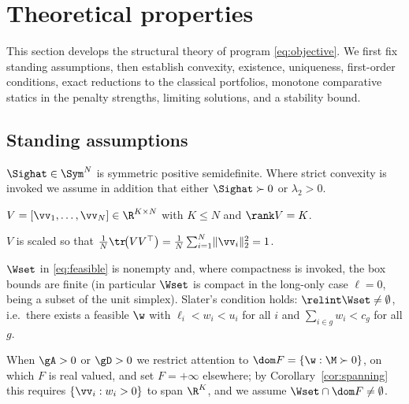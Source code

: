 \section{Theoretical properties}
\label{sec:theory}

This section develops the structural theory of program \eqref{eq:objective}. We
first fix standing assumptions, then establish convexity, existence, uniqueness,
first-order conditions, exact reductions to the classical portfolios, monotone
comparative statics in the penalty strengths, limiting solutions, and a stability
bound.

\subsection{Standing assumptions}
\label{sec:assumptions}

\begin{assumption}
\label{as:sigma}
$\Sighat\in\Sym^{N}$ is symmetric positive semidefinite. Where strict convexity
is invoked we assume in addition that either $\Sighat\succ0$ or $\lambda_2>0$.
\end{assumption}

\begin{assumption}
\label{as:V}
$V=[\vv_1,\dots,\vv_N]\in\R^{K\times N}$ with $K\le N$ and $\rank V=K$.
\end{assumption}

\begin{assumption}[Normalization]
\label{as:norm}
$V$ is scaled so that $\tfrac1N\tr\!\big(VV^\top\big)
=\tfrac1N\sum_{i=1}^{N}\lVert\vv_i\rVert_2^{2}=1$.
\end{assumption}

\begin{assumption}
\label{as:feasible}
$\Wset$ in \eqref{eq:feasible} is nonempty and, where compactness is invoked, the
box bounds are finite (in particular $\Wset$ is compact in the long-only case
$\ell=0$, being a subset of the unit simplex). Slater's condition holds:
$\relint\Wset\neq\emptyset$, i.e.\ there exists a feasible $\w$ with
$\ell_i<w_i<u_i$ for all $i$ and $\sum_{i\in g}w_i<c_g$ for all $g$.
\end{assumption}

\begin{assumption}
\label{as:domain}
When $\gA>0$ or $\gD>0$ we restrict attention to
$\dom F=\{\w:\M\succ0\}$, on which $F$ is real valued, and set $F=+\infty$
elsewhere; by Corollary~\ref{cor:spanning} this requires
$\{\vv_i:w_i>0\}$ to span $\R^{K}$, and we assume
$\Wset\cap\dom F\neq\emptyset$.
\end{assumption}

